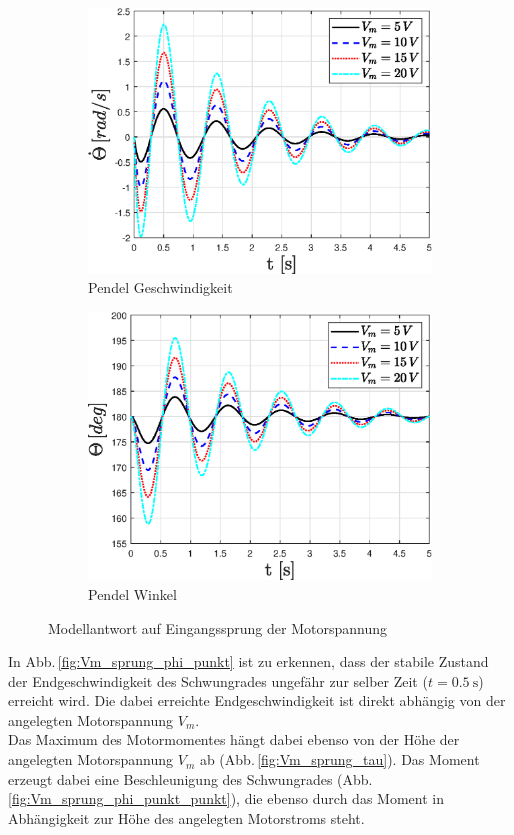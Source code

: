 \begin{figure}
    \begin{subfigure}[b]{0.49\linewidth}
        \includegraphics[width=\linewidth]{Bilder/5_sensi/fig/Vm_sprung/theta_punkt.eps}
        \caption{Pendel Geschwindigkeit}
        \label{fig:Vm_sprung_theta_punkt}      
    \end{subfigure}
    \begin{subfigure}[b]{0.49\linewidth}
        \includegraphics[width=\linewidth]{Bilder/5_sensi/fig/Vm_sprung/theta.eps}
        \caption{Pendel Winkel}
        \label{fig:Vm_sprung_theta}
    \end{subfigure}
        \caption{Modellantwort auf Eingangssprung der Motorspannung}
\end{figure}
In Abb.\,\ref{fig:Vm_sprung_phi_punkt} ist zu erkennen, dass der stabile Zustand der Endgeschwindigkeit des Schwungrades ungefähr zur selber Zeit ($t=\SI{0.5}{\s}$) erreicht wird.
Die dabei erreichte Endgeschwindigkeit ist direkt abhängig von der angelegten Motorspannung $V_m$.\\
Das Maximum des Motormomentes hängt dabei ebenso von der Höhe der angelegten Motorspannung $V_m$ ab (Abb.\,\ref{fig:Vm_sprung_tau}).
Das Moment erzeugt dabei eine Beschleunigung des Schwungrades (Abb.\,\ref{fig:Vm_sprung_phi_punkt_punkt}), die ebenso durch das Moment in Abhängigkeit zur Höhe des angelegten Motorstroms steht.

